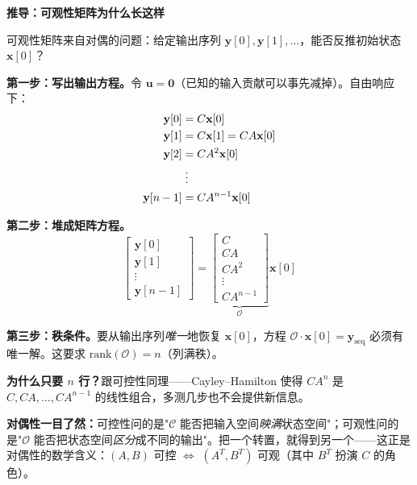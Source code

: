 \vspace{0.5em}
\begin{mdframed}[linewidth=1pt, innertopmargin=10pt, innerbottommargin=10pt]
\textbf{推导：可观性矩阵为什么长这样}

\vspace{0.3em}
可观性矩阵来自对偶的问题：给定输出序列 $\mathbf{y}[0], \mathbf{y}[1], \ldots$，能否反推初始状态 $\mathbf{x}[0]$？

\textbf{第一步：写出输出方程。}令 $\mathbf{u} = \mathbf{0}$（已知的输入贡献可以事先减掉）。自由响应下：
\begin{align}
\mathbf{y}[0] &= C\mathbf{x}[0] \\
\mathbf{y}[1] &= C\mathbf{x}[1] = CA\mathbf{x}[0] \\
\mathbf{y}[2] &= CA^2\mathbf{x}[0] \\
&\;\vdots \notag \\
\mathbf{y}[n-1] &= CA^{n-1}\mathbf{x}[0]
\end{align}

\textbf{第二步：堆成矩阵方程。}
\begin{equation}
\begin{bmatrix} \mathbf{y}[0] \\ \mathbf{y}[1] \\ \vdots \\ \mathbf{y}[n-1] \end{bmatrix}
= \underbrace{\begin{bmatrix} C \\ CA \\ CA^2 \\ \vdots \\ CA^{n-1} \end{bmatrix}}_{\mathcal{O}} \mathbf{x}[0]
\end{equation}

\textbf{第三步：秩条件。}要从输出序列\textit{唯一}地恢复 $\mathbf{x}[0]$，方程 $\mathcal{O} \cdot \mathbf{x}[0] = \mathbf{y}_{\text{seq}}$ 必须有唯一解。这要求 $\text{rank}(\mathcal{O}) = n$（列满秩）。

\textbf{为什么只要 $n$ 行？}跟可控性同理——Cayley--Hamilton 使得 $CA^n$ 是 $C, CA, \ldots, CA^{n-1}$ 的线性组合，多测几步也不会提供新信息。

\textbf{对偶性一目了然：}可控性问的是"$\mathcal{C}$ 能否把输入空间\textit{映满}状态空间"；可观性问的是"$\mathcal{O}$ 能否把状态空间\textit{区分}成不同的输出"。把一个转置，就得到另一个——这正是对偶性的数学含义：$(A, B)$ 可控 $\Leftrightarrow$ $(A^T, B^T)$ 可观（其中 $B^T$ 扮演 $C$ 的角色）。
\end{mdframed}

